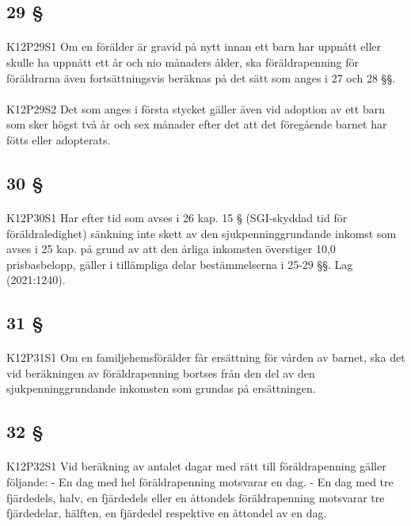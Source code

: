 \documentclass[a4paper,notitlepage,openany,10pt]{book}
\begin{document}
\subsection*{29 §}
\paragraph*{}
{\tiny K12P29S1}
Om en förälder är gravid på nytt innan ett barn har uppnått eller skulle ha uppnått ett år och nio månaders ålder, ska föräldrapenning för föräldrarna även fortsättningsvis beräknas på det sätt som anges i 27 och 28 §§.
\paragraph*{}
{\tiny K12P29S2}
Det som anges i första stycket gäller även vid adoption av ett barn som sker högst två år och sex månader efter det att det föregående barnet har fötts eller adopterats.
\subsection*{30 §}
\paragraph*{}
{\tiny K12P30S1}
Har efter tid som avses i 26 kap. 15 § (SGI-skyddad tid för föräldraledighet) sänkning inte skett av den sjukpenninggrundande inkomst som avses i 25 kap. på grund av att den årliga inkomsten överstiger 10,0 prisbasbelopp, gäller i tillämpliga delar bestämmelserna i 25-29 §§.
Lag (2021:1240).
\subsection*{31 §}
\paragraph*{}
{\tiny K12P31S1}
Om en familjehemsförälder får ersättning för vården av barnet, ska det vid beräkningen av föräldrapenning bortses från den del av den sjukpenninggrundande inkomsten som grundas på ersättningen.
\subsection*{32 §}
\paragraph*{}
{\tiny K12P32S1}
Vid beräkning av antalet dagar med rätt till föräldrapenning gäller följande:
\newline - En dag med hel föräldrapenning motsvarar en dag.
\newline - En dag med tre fjärdedels, halv, en fjärdedels eller en åttondels föräldrapenning motsvarar tre fjärdedelar, hälften, en fjärdedel respektive en åttondel av en dag.
\end{document}
